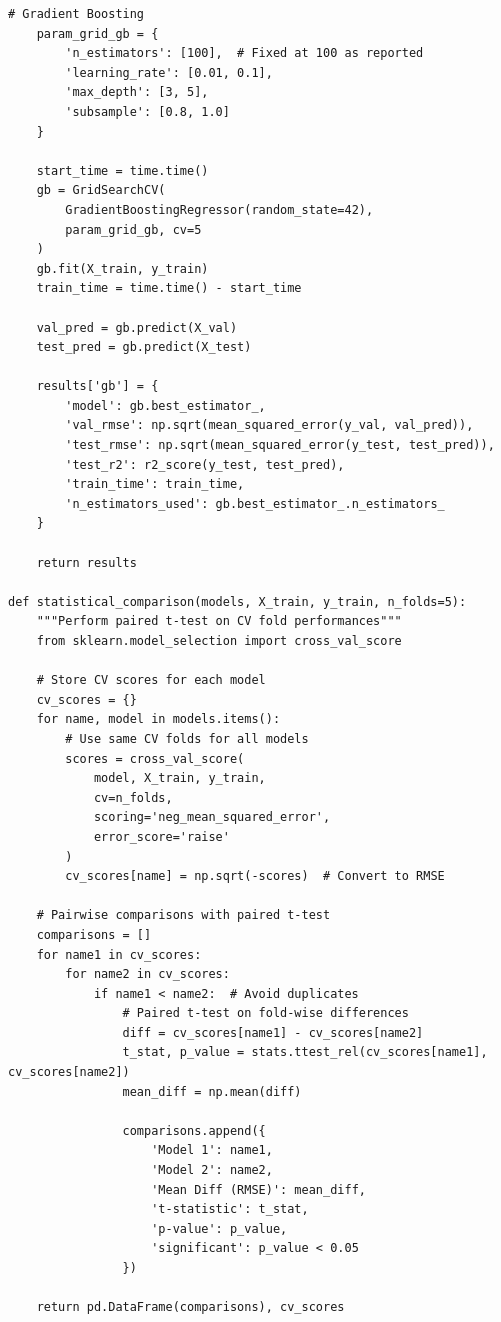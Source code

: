 \documentclass[12pt,a4paper]{article}
\theoremstyle{definition}
\begin{document}
\begin{lstlisting}[caption={Data Preparation and SVR Implementation with Proper Metrics}]
    # Gradient Boosting
    param_grid_gb = {
        'n_estimators': [100],  # Fixed at 100 as reported
        'learning_rate': [0.01, 0.1],
        'max_depth': [3, 5],
        'subsample': [0.8, 1.0]
    }
    
    start_time = time.time()
    gb = GridSearchCV(
        GradientBoostingRegressor(random_state=42), 
        param_grid_gb, cv=5
    )
    gb.fit(X_train, y_train)
    train_time = time.time() - start_time
    
    val_pred = gb.predict(X_val)
    test_pred = gb.predict(X_test)
    
    results['gb'] = {
        'model': gb.best_estimator_,
        'val_rmse': np.sqrt(mean_squared_error(y_val, val_pred)),
        'test_rmse': np.sqrt(mean_squared_error(y_test, test_pred)),
        'test_r2': r2_score(y_test, test_pred),
        'train_time': train_time,
        'n_estimators_used': gb.best_estimator_.n_estimators_
    }
    
    return results

def statistical_comparison(models, X_train, y_train, n_folds=5):
    """Perform paired t-test on CV fold performances"""
    from sklearn.model_selection import cross_val_score
    
    # Store CV scores for each model
    cv_scores = {}
    for name, model in models.items():
        # Use same CV folds for all models
        scores = cross_val_score(
            model, X_train, y_train, 
            cv=n_folds, 
            scoring='neg_mean_squared_error',
            error_score='raise'
        )
        cv_scores[name] = np.sqrt(-scores)  # Convert to RMSE
    
    # Pairwise comparisons with paired t-test
    comparisons = []
    for name1 in cv_scores:
        for name2 in cv_scores:
            if name1 < name2:  # Avoid duplicates
                # Paired t-test on fold-wise differences
                diff = cv_scores[name1] - cv_scores[name2]
                t_stat, p_value = stats.ttest_rel(cv_scores[name1], cv_scores[name2])
                mean_diff = np.mean(diff)
                
                comparisons.append({
                    'Model 1': name1,
                    'Model 2': name2,
                    'Mean Diff (RMSE)': mean_diff,
                    't-statistic': t_stat,
                    'p-value': p_value,
                    'significant': p_value < 0.05
                })
    
    return pd.DataFrame(comparisons), cv_scores


\end{lstlisting}
\end{document}
